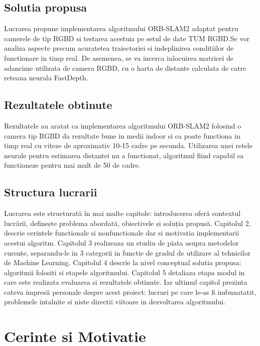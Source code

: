 \documentclass[12pt,a4paper]{report}
\begin{document}
\section{Solutia propusa}
Lucrarea propune implementarea algoritmului ORB-SLAM2 adaptat pentru camerele de tip RGBD
si testarea acestuia pe setul de date TUM RGBD.\@ Se vor analiza aspecte precum acuratetea 
traiectoriei si indeplinirea conditiilor de functionare in timp real. De asemenea, se va 
incerca inlocuirea matricei de adancime utilizata de camera RGBD, cu o harta de distante 
calculata de catre reteaua neurala FastDepth.  

\section{Rezultatele obtinute}
Rezultatele au aratat ca implementarea algoritmului ORB-SLAM2 folosind o camera tip RGBD 
da rezultate bune in medii indoor si ca poate functiona in timp real cu viteze de aproximativ
10{-}15 cadre pe secunda. Utilizarea unei retele neurale pentru estimarea distantei nu a 
functionat, algoritmul fiind capabil sa functioneze pentru mai mult de 50 de cadre.  

\section{Structura lucrarii}
Lucrarea este structurată în mai multe capitole: introducerea oferă contextul lucrării,
definește problema abordată, obiectivele și soluția propusă. Capitolul 2, descrie 
cerintele functionale si nonfunctionale dar si motivatia implementarii acestui algoritm.
Capitolul 3 realizeaza un studiu de piata asupra metodelor curente, separandu-le in 3
categorii in functie de gradul de utilizare al tehnicilor de Machine Learning. Capitolul 
4 descrie la nivel conceptual solutia propusa: algoritmii folositi si etapele algoritmului.
Capitolul 5 detaliaza etapa modul in care este realizata evaluarea si rezultatele obtinute.
Iar ultimul capitol prezinta cateva impresii personale despre acest proiect: lucruri pe 
care le-as fi imbunatatit, problemele intalnite si niste directii viitoare in dezvoltarea
algoritmului. 

\chapter{Cerinte si Motivatie}
\end{document}
